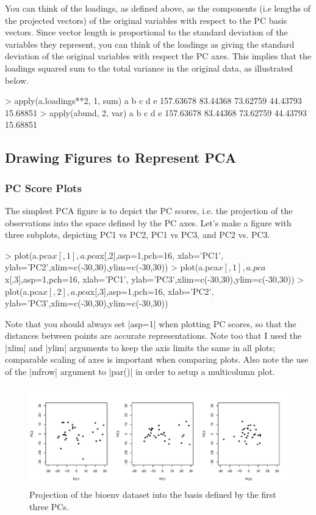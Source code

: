 You can think of the loadings, as defined above, as the components (i.e lengths of the projected vectors) of the original variables with respect to the PC basis vectors.  Since vector length is proportional to the standard deviation of the variables they represent, you can think of the loadings as giving the standard deviation of the original variables with respect the PC axes. This implies that the loadings squared sum to the total variance in the original data, as illustrated below.
\begin{R}
> apply(a.loadings**2, 1, sum)
        a         b         c         d         e
157.63678  83.44368  73.62759  44.43793  15.68851
> apply(abund, 2, var)
        a         b         c         d         e
157.63678  83.44368  73.62759  44.43793  15.68851
\end{R}

\subsection{Drawing Figures to Represent PCA}

\subsubsection{PC Score Plots}

The simplest PCA figure is to depict the PC scores, i.e. the projection of the observations into the space defined by the PC axes. Let's make a figure with three subplots, depicting PC1 vs PC2, PC1 vs PC3, and PC2 vs. PC3.
\begin{R}
> plot(a.pca$x[,1], a.pca$x[,2],asp=1,pch=16, xlab='PC1', ylab='PC2',xlim=c(-30,30),ylim=c(-30,30))
> plot(a.pca$x[,1], a.pca$x[,3],asp=1,pch=16, xlab='PC1', ylab='PC3',xlim=c(-30,30),ylim=c(-30,30))
> plot(a.pca$x[,2], a.pca$x[,3],asp=1,pch=16, xlab='PC2', ylab='PC3',xlim=c(-30,30),ylim=c(-30,30))
\end{R}
Note that you should always set |asp=1| when plotting PC scores, so that the distances between points are accurate representations. Note too that I used the |xlim| and |ylim| arguments to keep the axis limits the same in all plots; comparable scaling of axes is important when comparing plots. Also note the use of the |mfrow| argument to |par()| in order to setup a multicolumn plot.

\begin{figure}[htbp]
\centering
\includegraphics[width=0.95\columnwidth]{./figures/hands-on5/bioenv-scores.pdf}
\caption{Projection of the bioenv dataset into the basis defined by the first three PCs.}\label{fig:bioenvscore}
\end{figure}


